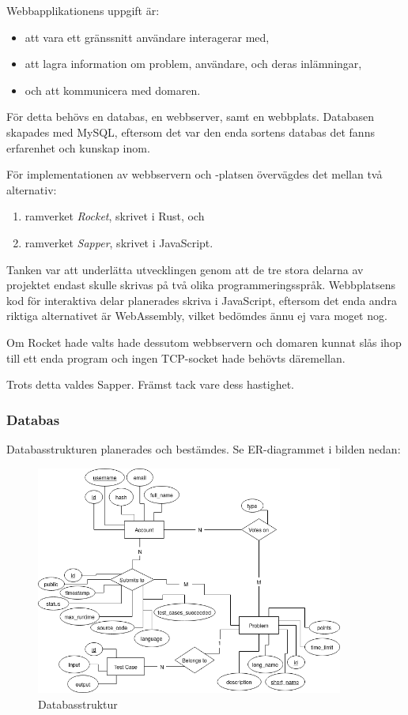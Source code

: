 \documentclass{article}
\begin{document}
Webbapplikationens uppgift är:

\begin{itemize}
	\item att vara ett gränssnitt användare interagerar med,
	\item att lagra information om problem, användare, och deras inlämningar,
	\item och att kommunicera med domaren.
\end{itemize}

För detta behövs en databas, en webbserver, samt en webbplats. Databasen
skapades med MySQL, eftersom det var den enda sortens databas det fanns
erfarenhet och kunskap inom.

För implementationen av webbservern och -platsen övervägdes det mellan två
alternativ:

\begin{enumerate}
	\item ramverket \textit{Rocket}, skrivet i Rust, och
	\item ramverket \textit{Sapper}, skrivet i JavaScript.
\end{enumerate}

Tanken var att underlätta utvecklingen genom att de tre stora delarna av
projektet endast skulle skrivas på två olika programmeringsspråk. Webbplatsens
kod för interaktiva delar planerades skriva i JavaScript, eftersom det enda
andra riktiga alternativet är WebAssembly, vilket bedömdes ännu ej vara moget
nog.

Om Rocket hade valts hade dessutom webbservern och domaren kunnat slås ihop till
ett enda program och ingen TCP-socket hade behövts däremellan.

Trots detta valdes Sapper. Främst tack vare dess hastighet.

\subsubsection{Databas}

Databasstrukturen planerades och bestämdes. Se ER-diagrammet i bilden nedan:

\begin{figure}[H]
	\centering
	\includegraphics[width=0.9\textwidth]{database-schema}
	\caption{Databasstruktur}\label{dbschema}
\end{figure}
\end{document}
